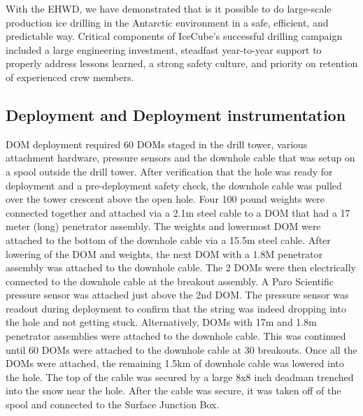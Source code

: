 
With the EHWD, we have demonstrated that is it possible to do large-scale production ice drilling in the Antarctic environment in a safe, efficient, and predictable way.  Critical components of IceCube’s successful drilling campaign included a large engineering investment, steadfast year-to-year support to properly address lessons learned, a strong safety culture, and priority on retention of experienced crew members.

\subsection{Deployment and Deployment instrumentation}

DOM deployment required 60 DOMs staged in the drill tower, various attachment hardware, pressure sensors and the downhole cable that was setup on a spool outside the drill tower. After verification that the hole was ready for deployment and a pre-deployment safety check, the downhole cable was pulled over the tower crescent above the open hole. Four 100 pound weights were connected together and attached via a 2.1m steel cable to a DOM that had a 17 meter (long) penetrator assembly. The weights and lowermost DOM were attached to the bottom of the downhole cable via a 15.5m steel cable. After lowering of the DOM and weights, the next DOM with a 1.8M penetrator assembly was attached to the downhole cable. The 2 DOMs were then electrically connected to the downhole cable at the breakout assembly. A Paro Scientific pressure sensor was attached just above the 2nd DOM. The pressure sensor was readout during deployment to confirm that the string was indeed dropping into the hole and not getting stuck. Alternatively, DOMs with 17m and 1.8m penetrator assemblies were attached to the downhole cable. This was continued until 60 DOMs were attached to the downhole cable at 30 breakouts. Once all the DOMs were attached, the remaining 1.5km of downhole cable was lowered into the hole. The top of the cable was secured by a large 8x8 inch deadman trenched into the snow near the hole. After the cable was secure, it was taken off of the spool and connected to the Surface Junction Box.

